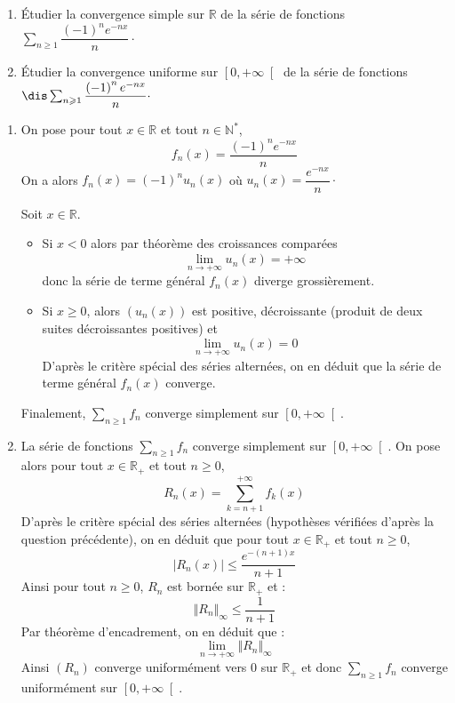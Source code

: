 \documentclass[a4paper,10pt]{report}
\begin{document}
\everymath{\displaystyle}


\begin{center}
\end{center}

\bigskip

\begin{Exa} \begin{enumerate}
\item \'Etudier la convergence simple sur $\mathbb{R}$  de la série de fonctions $\displaystyle\sum_{n\geqslant1}^{} \dfrac{\left(-1\right)^{n}e^{-nx}}{n} \cdot$
\item
\'Etudier la convergence uniforme sur $\left[ 0,+\infty\right[ $  de la série de fonctions $\dis \sum_{n\geqslant1}^{} \dfrac{\left(-1\right)^{n}e^{-nx}}{n} \cdot$
\end{enumerate}
\end{Exa}

\corr \begin{enumerate}

\item On pose pour tout $x\in\mathbb{R}$ et tout $n\in\mathbb{N}^*$, 
$$f_n(x)=\dfrac{\left(-1\right)^{n}e^{-nx}}{n}$$
On a alors $f_n(x)=(-1)^nu_n(x)$ où $u_n(x)=\dfrac{e^{-nx}}{n} \cdot$

\noindent Soit $x \in \mathbb{R}$.
\begin{itemize}
\item Si $x<0$ alors par théorème des croissances comparées
$$\lim\limits_{n\to +\infty}^{} u_n(x) =+\infty$$
donc la série de terme général $f_n(x)$ diverge grossièrement.
\item Si $x\geq 0$, alors $(u_n(x))$ est positive, décroissante (produit de deux suites décroissantes positives) et 
$$\lim\limits_{n\to +\infty}^{}u_n(x)=0$$
D'après le critère spécial des séries alternées, on en déduit que la série de terme général $f_n(x)$ converge.
\end{itemize}
Finalement, $\displaystyle\sum\limits_{n\geqslant1}^{}f_n$ converge simplement sur $\left[ 0,+\infty\right[$.
\item La série de fonctions $\displaystyle\sum\limits_{n\geqslant1}^{}f_n$ converge simplement sur $\left[ 0,+\infty\right[ $. On pose alors pour tout $x \in \mathbb{R}_+$ et tout $n \geq 0$, 
$$ R_n(x)=\displaystyle\sum\limits_{k=n+1}^{+\infty}f_k(x)$$
D'après le critère spécial des séries alternées (hypothèses vérifiées d'après la question précédente), on en déduit que pour tout $x \in \mathbb{R}_+$ et tout $n \geq 0$,
$$|R_n(x)|\leqslant \dfrac{e^{-(n+1)x}}{n+1}$$
Ainsi pour tout $n \geq 0$, $R_n$ est bornée sur $\mathbb{R}_+$ et :
$$\Vert R_n \Vert_{\infty}\leq \dfrac{1}{n+1}$$
Par théorème d'encadrement, on en déduit que :
$$ \lim_{n \rightarrow + \infty} \Vert R_n \Vert_{\infty}$$
Ainsi $(R_n)$ converge uniformément vers $0$ sur $\mathbb{R}_+$ et donc $\displaystyle\sum\limits_{n\geqslant1}^{}f_n$ converge uniformément sur $\left[ 0,+\infty\right[ $.
\end{enumerate}
\end{document}
